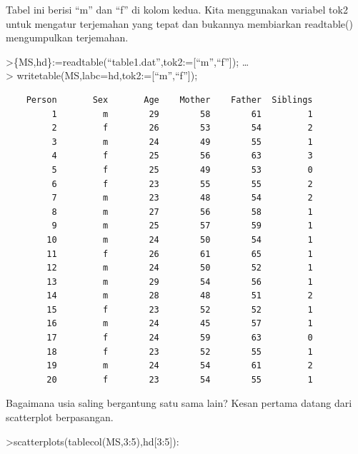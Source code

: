 \documentclass[
]{book}
\begin{document}
Tabel ini berisi ``m'' dan ``f'' di kolom kedua. Kita menggunakan variabel tok2 untuk mengatur terjemahan yang tepat dan bukannya membiarkan readtable() mengumpulkan terjemahan.

\textgreater\{MS,hd\}:=readtable(``table1.dat'',tok2:={[}``m'',``f''{]}); \ldots{}\\
\textgreater{} writetable(MS,labc=hd,tok2:={[}``m'',``f''{]});

\begin{verbatim}
    Person       Sex       Age    Mother    Father  Siblings
         1         m        29        58        61         1
         2         f        26        53        54         2
         3         m        24        49        55         1
         4         f        25        56        63         3
         5         f        25        49        53         0
         6         f        23        55        55         2
         7         m        23        48        54         2
         8         m        27        56        58         1
         9         m        25        57        59         1
        10         m        24        50        54         1
        11         f        26        61        65         1
        12         m        24        50        52         1
        13         m        29        54        56         1
        14         m        28        48        51         2
        15         f        23        52        52         1
        16         m        24        45        57         1
        17         f        24        59        63         0
        18         f        23        52        55         1
        19         m        24        54        61         2
        20         f        23        54        55         1
\end{verbatim}

Bagaimana usia saling bergantung satu sama lain? Kesan pertama datang dari scatterplot berpasangan.

\textgreater scatterplots(tablecol(MS,3:5),hd{[}3:5{]}):
\end{document}
